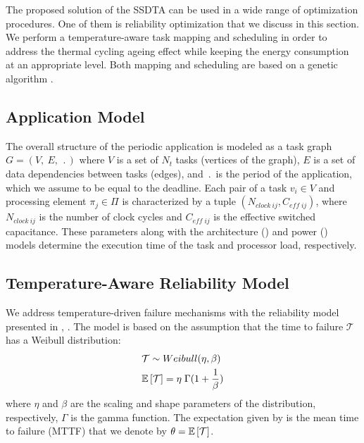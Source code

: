 The proposed solution of the SSDTA can be used in a wide range of optimization procedures. One of them is reliability optimization that we discuss in this section. We perform a temperature-aware task mapping and scheduling in order to address the thermal cycling ageing effect while keeping the energy consumption at an appropriate level. Both mapping and scheduling are based on a genetic algorithm \cite{schmitz2004}.

\subsection{Application Model} \label{sec:application-model}
The overall structure of the periodic application is modeled as a task graph $G = (V, \: E, \: \period)$ where $V$ is a set of $N_t$ tasks (vertices of the graph), $E$ is a set of data dependencies between tasks (edges), and $\period$ is the period of the application, which we assume to be equal to the deadline. Each pair of a task $v_i \in V$ and processing element $\pi_j \in \Pi$ is characterized by a tuple $(N_{clock \: ij}, C_{eff \; ij})$, where $N_{clock \: ij}$ is the number of clock cycles and $C_{eff \; ij}$ is the effective switched capacitance. These parameters along with the architecture () and power () models determine the execution time of the task and processor load, respectively.

\subsection{Temperature-Aware Reliability Model} \label{sec:reliability-model}
We address temperature-driven failure mechanisms with the reliability model presented in \cite{huang2009}, \cite{xiang2010}. The model is based on the assumption that the time to failure $\mathcal{T}$ has a Weibull distribution:
\begin{align}
  & \mathcal{T} \sim Weibull(\eta, \beta) \nonumber \\
  & \mathbb{E}\left[ \mathcal{T} \right] = \eta \; \Gamma(1 + \frac{1}{\beta}) \label{eq:general-mttf}
\end{align}
where $\eta$ and $\beta$ are the scaling and shape parameters of the distribution, respectively, $\Gamma$ is the gamma function. The expectation given by  is the mean time to failure (MTTF) that we denote by $\theta = \mathbb{E}\left[ \mathcal{T} \right]$.

